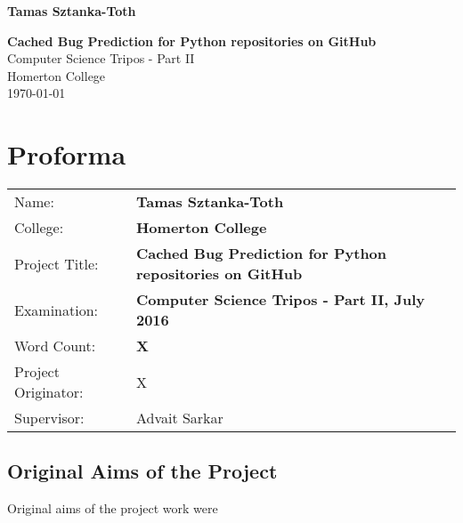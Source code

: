 \documentclass[12pt,twoside,notitlepage]{report}
\begin{document}





\pagestyle{empty}

\hfill{\LARGE \bf Tamas Sztanka-Toth}

\vspace*{60mm}
\begin{center}
\Huge
{\bf Cached Bug Prediction for Python repositories on GitHub} \\
\vspace*{5mm}
Computer Science Tripos - Part II \\
\vspace*{5mm}
Homerton College \\
\vspace*{5mm}
\today  %
\end{center}

\cleardoublepage


\setcounter{page}{1}
\pagestyle{plain}

\chapter*{Proforma}

{\large
\begin{tabular}{ll}
Name:               & \bf Tamas Sztanka-Toth                       \\
College:            & \bf Homerton College                     \\
Project Title:      & \bf Cached Bug Prediction for Python repositories on GitHub \\
Examination:        & \bf Computer Science Tripos - Part II, July 2016        \\
Word Count:         & \bf X\footnotemark[1]				 \\
Project Originator: & X                   \\
Supervisor:         & Advait Sarkar                    \\ 
\end{tabular}
}


\section*{Original Aims of the Project}
Original aims of the project work were\cite{Git} \cite{SZZ}\cite{KimZim}\cite{KimZim}
\cite{FixCache}
\end{document}
